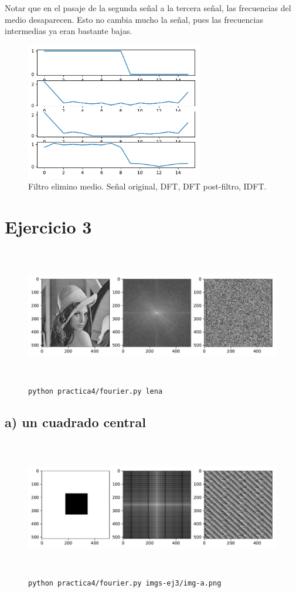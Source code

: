\documentclass[11pt, spanish]{article}
\begin{document}
Notar que en el pasaje de la segunda señal a la tercera señal, las frecuencias del medio desaparecen.
Esto no cambia mucho la señal, pues las frecuencias intermedias ya eran bastante bajas.
\begin{figure}[H]
\centering
  \includegraphics[height=6cm]{informe-imgs/ej2-elimino-medio.pdf}
  \caption{Filtro elimino medio. Señal original, DFT, DFT post-filtro, IDFT.}
\end{figure}

\newpage
\section{Ejercicio 3}

\begin{figure}[H]
\centering
  \includegraphics[height=6cm]{informe-imgs/ej3-lena.pdf}
  \caption{\texttt{python practica4/fourier.py lena}}
\end{figure}

\subsection{a) un cuadrado central}
\begin{figure}[H]
\centering
  \includegraphics[height=6cm]{informe-imgs/ej3-a.pdf}
  \caption{\texttt{python practica4/fourier.py imgs-ej3/img-a.png}}
\end{figure}
\end{document}
